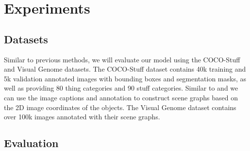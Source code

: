 \documentclass{article}
\begin{document}




\section{Experiments}

\subsection{Datasets}

Similar to previous methods, we will evaluate our model using the COCO-Stuff \cite{cocostuff} and Visual Genome \cite{visualgen} datasets. The COCO-Stuff dataset contains 40k training and 5k validation annotated images with bounding boxes and segmentation masks, as well as providing 80 thing categories and 90 stuff categories. Similar to \cite{sg2im} and \cite{sg2imgcontext} we can use the image captions and annotation to construct scene graphs based on the 2D image coordinates of the objects. The Visual Genome dataset contains over 100k images annotated with their scene graphs.

\subsection{Evaluation}
\end{document}
